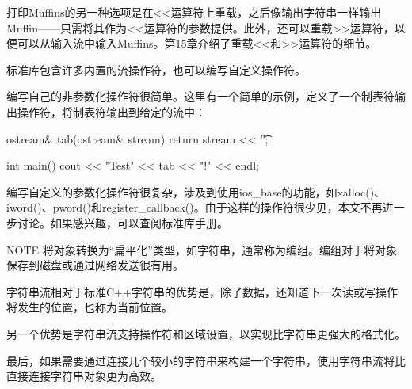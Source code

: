 打印Muffins的另一种选项是在<{}<运算符上重载，之后像输出字符串一样输出Muffin——只需将其作为<{}<运算符的参数提供。此外，还可以重载>{}>运算符，以便可以从输入流中输入Muffins。第15章介绍了重载<{}<和>{}>运算符的细节。


标准库包含许多内置的流操作符，也可以编写自定义操作符。

编写自己的非参数化操作符很简单。这里有一个简单的示例，定义了一个制表符输出操作符，将制表符输出到给定的流中：

\begin{cpp}
ostream& tab(ostream& stream) { return stream << '\t'; }

int main()
{
    cout << "Test" << tab << "!" << endl;
}
\end{cpp}

编写自定义的参数化操作符很复杂，涉及到使用ios\_base的功能，如xalloc()、iword()、pword()和register\_callback()。由于这样的操作符很少见，本文不再进一步讨论。如果感兴趣，可以查阅标准库手册。

\begin{myNotic}{NOTE}
将对象转换为“扁平化”类型，如字符串，通常称为编组。编组对于将对象保存到磁盘或通过网络发送很有用。
\end{myNotic}

字符串流相对于标准C++字符串的优势是，除了数据，还知道下一次读或写操作将发生的位置，也称为当前位置。

另一个优势是字符串流支持操作符和区域设置，以实现比字符串更强大的格式化。

最后，如果需要通过连接几个较小的字符串来构建一个字符串，使用字符串流将比直接连接字符串对象更为高效。

